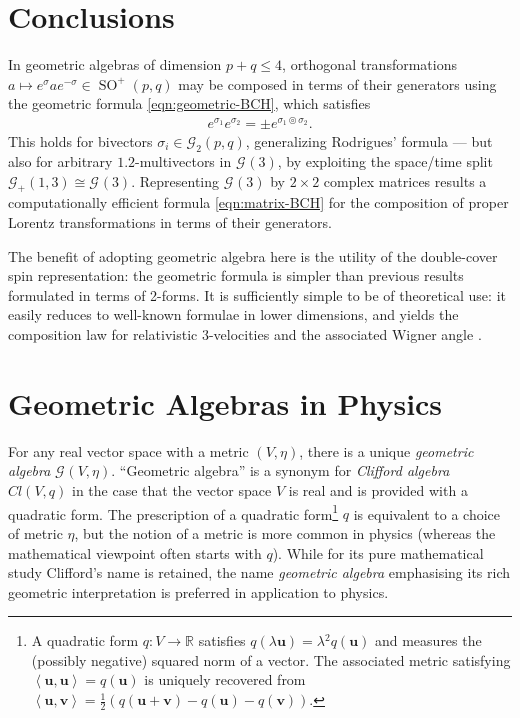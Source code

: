 \documentclass[12pt,a4paper]{article}
\makeatletter
\newcommand\x[1]{\@nameuse{\detokenize{#1}}}
\renewcommand{\vb}[1]{\boldsymbol{#1}}
\renewcommand{\ip}[2]{\left\langle#1,#2\right\rangle}
\newcommand{\GA}[1][]{\mathcal{G}_{#1}}
\newcommand{\RR}{\mathds{R}}
\DeclareMathOperator{\SO}{SO}
\newcommand{\bch}[2]{#1 \circledcirc #2}
\makeatother
\begin{document}
\section{Conclusions}


In geometric algebras of dimension $p + q \leq{} 4$, orthogonal transformations $a \mapsto e^\sigma{}ae^{-\sigma{}} \in \SO^+(p, q)$ may be composed in terms of their generators using the geometric \x{BCH} formula \eqref{eqn:geometric-BCH}, which satisfies
\begin{align}
	e^{\sigma{}_1}e^{\sigma{}_2} = \pm e^{\bch{\sigma{}_1}{\sigma{}_2}}
	\label{eqn:BCH-application}
.\end{align}
This holds for bivectors $\sigma{}_i \in \GA[2](p, q)$, generalizing Rodrigues' formula --- but also for arbitrary $\qty{1,2}$-multivectors in $\GA(3)$, by exploiting the space/time split $\GA[+](1,3) \cong \GA(3)$.
Representing $\GA(3)$ by $2\times{}2$ complex matrices results a computationally efficient formula \eqref{eqn:matrix-BCH} for the composition of proper Lorentz transformations in terms of their generators.

The benefit of adopting geometric algebra here is the utility of the double-cover spin representation: the geometric \x{BCH} formula is simpler than previous results \cite{coll1990sr-generator-exponentiation,coll2002sr-generator-composition} formulated in terms of 2-forms.
It is sufficiently simple to be of theoretical use: it easily reduces to well-known formulae in lower dimensions, and yields the composition law \cite{berry2020quat-sr} for relativistic $3$-velocities and the associated Wigner angle \cite{berry2021quat-sr,visser2011sr-velocity-composition}.




\appendix
\section{Geometric Algebras in Physics}
\label{apx:geoalg}

For any real vector space with a metric $(V, \eta{})$, there is a unique \emph{geometric algebra} $\GA(V, \eta{})$.
``Geometric algebra'' is a synonym for \emph{Clifford algebra} $Cl(V, q)$ in the case that the vector space $V$ is real and is provided with a quadratic form.
The prescription of a quadratic form\footnote{
	A quadratic form $q : V \to \RR$ satisfies $q(\lambda{}\vb{u}) = \lambda{}^2q(\vb{u})$ and measures the (possibly negative) squared norm of a vector.
	The associated metric satisfying $\ip{\vb{u}}{\vb{u}} = q(\vb{u})$ is uniquely recovered from
	\begin{math}
		\ip{\vb{u}}{\vb{v}} = \frac12(q(\vb{u} + \vb{v}) - q(\vb{u}) - q(\vb{v}))
	.\end{math}
	
} $q$ is equivalent to a choice of metric $\eta{}$, but the notion of a metric is more common in physics (whereas the mathematical viewpoint often starts with $q$).
While for its pure mathematical study Clifford's name is retained, the name \emph{geometric algebra} emphasising its rich geometric interpretation is preferred in application to physics.
\end{document}
